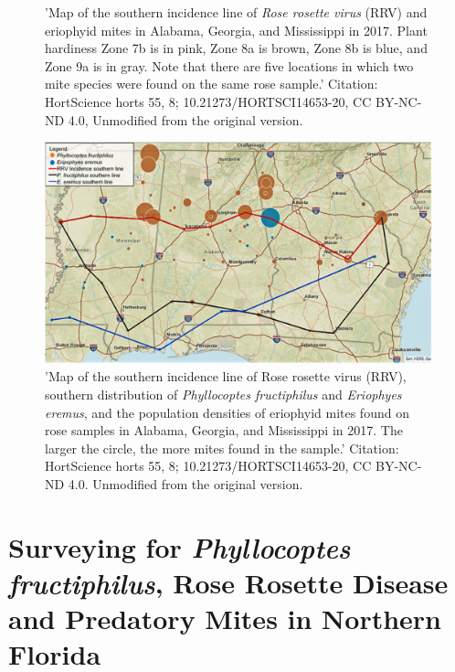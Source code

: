 \documentclass{ufdissertation}[overrideChapters] %
\begin{document}
{\begin{figure}
{}

\caption[Map of the southern incidence line of \textit{{Rose rosette virus}} (RRV) and eriophyid mites, from Solo et al. 2020]{'Map of the southern incidence line of \textit{{Rose rosette virus}} (RRV) and eriophyid mites in Alabama, Georgia, and Mississippi in 2017. Plant hardiness Zone 7b is in pink, Zone 8a is brown, Zone 8b is blue, and Zone 9a is in gray. Note that there are five locations in which two mite species were found on the same rose sample.' Citation: HortScience horts 55, 8; 10.21273/HORTSCI14653-20, CC BY-NC-ND 4.0, Unmodified from the original version.}\label{fig:solo-map-1}
\end{figure}
\begin{figure}

{\centering \includegraphics[width=1\linewidth]{figure/full-1288fig2} 

}

\caption[Map of the southern incidence line of Rose rosette virus (RRV), southern distribution of \textit{{Phyllocoptes fructiphilus}} and \textit{{Eriophyes eremus}}, from Solo et al. 2020]{'Map of the southern incidence line of Rose rosette virus (RRV), southern distribution of \textit{{Phyllocoptes fructiphilus}} and \textit{{Eriophyes eremus}}, and the population densities of eriophyid mites found on rose samples in Alabama, Georgia, and Mississippi in 2017. The larger the circle, the more mites found in the sample.' Citation: HortScience horts 55, 8; 10.21273/HORTSCI14653-20, CC BY-NC-ND 4.0. Unmodified from the original version.}\label{fig:solo-map-2}
\end{figure}
\hypertarget{surveying-for-phyllocoptes-fructiphilus-rose-rosette-disease-and-predatory-mites-in-northern-florida}{%
\section{\texorpdfstring{Surveying for \emph{Phyllocoptes fructiphilus}, Rose Rosette Disease and Predatory Mites in Northern Florida}{Surveying for Phyllocoptes fructiphilus, Rose Rosette Disease and Predatory Mites in Northern Florida}}\label{surveying-for-phyllocoptes-fructiphilus-rose-rosette-disease-and-predatory-mites-in-northern-florida}}

}
\end{document}
